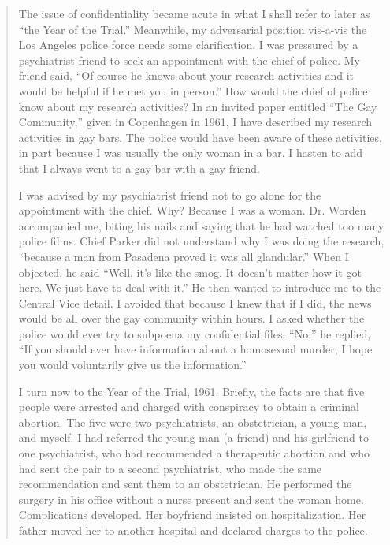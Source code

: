 \begin{quote}
The issue of confidentiality became acute in what I shall refer to later as ``the Year of the Trial.'' Meanwhile, my adversarial position vis-a-vis the Los Angeles police force needs some clarification. I was pressured by a psychiatrist friend to seek an appointment with the chief of police. My friend said, ``Of course he knows about your research activities and it would be helpful if he met you in person.'' How would the chief of police know about my research activities? In an invited paper entitled ``The Gay Community,'' given in Copenhagen in 1961, I have described my research activities in gay bars. The police would have been aware of these activities, in part because I was usually the only woman in a bar. I hasten to add that I always went to a gay bar with a gay friend.

I was advised by my psychiatrist friend not to go alone for the appointment with the chief. Why? Because I was a woman. Dr. Worden accompanied me, biting his nails and saying that he had watched too many police films. Chief Parker did not understand why I was doing the research, ``because a man from Pasadena proved it was all glandular.'' When I objected, he said ``Well, it's like the smog. It doesn't matter how it got here. We just have to deal with it.'' He then wanted to introduce me to the Central Vice detail. I avoided that because I knew that if I did, the news would be all over the gay community within hours. I asked whether the police would ever try to subpoena my confidential files. ``No,'' he replied, ``If you should ever have information about a homosexual murder, I hope you would voluntarily give us the information.''

I turn now to the Year of the Trial, 1961. Briefly, the facts are that five people were arrested and charged with conspiracy to obtain a criminal abortion. The five were two psychiatrists, an obstetrician, a young man, and myself. I had referred the young man (a friend) and his girlfriend to one psychiatrist, who had recommended a therapeutic abortion and who had sent the pair to a second psychiatrist, who made the same recommendation and sent them to an obstetrician. He performed the surgery in his office without a nurse present and sent the woman home. Complications developed. Her boyfriend insisted on hospitalization. Her father moved her to another hospital and declared charges to the police.


\end{quote}
